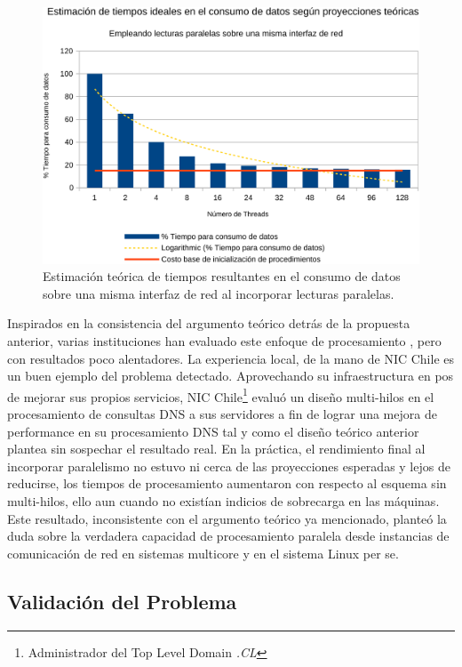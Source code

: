 \begin{figure}[!h]
	\centering
	\includegraphics[scale=0.6]{resultados/proyeccionTeorica-crop.pdf}
	\caption{Estimación teórica de tiempos resultantes en el consumo de datos sobre una misma interfaz de red al incorporar lecturas paralelas.}
	\label{fig:proyeccionTeorica}
\end{figure}

Inspirados en la consistencia del argumento teórico detrás de la propuesta anterior, varias instituciones han evaluado este enfoque de procesamiento \cite{post:facebook, paper:toshiba}, pero con resultados poco alentadores. La experiencia local, de la mano de NIC Chile es un buen ejemplo del problema detectado. Aprovechando su infraestructura en pos de mejorar sus propios servicios, NIC Chile\footnote{Administrador del Top Level Domain \emph{.CL}} evaluó un diseño multi-hilos en el procesamiento de consultas DNS a sus servidores a fin de lograr una mejora de performance en su procesamiento DNS tal y como el diseño teórico anterior plantea sin sospechar el resultado real. En la práctica, el rendimiento final al incorporar paralelismo no estuvo ni cerca de las proyecciones esperadas y lejos de reducirse, los tiempos de procesamiento aumentaron con respecto al esquema sin multi-hilos, ello aun cuando no existían indicios de sobrecarga en las máquinas. Este resultado, inconsistente con el argumento teórico ya mencionado, planteó la duda sobre la verdadera capacidad de procesamiento paralela desde instancias de comunicación de red en sistemas multicore y en el sistema Linux per se.


\subsection{Validación del Problema}

